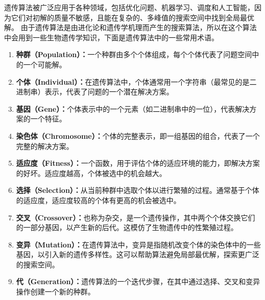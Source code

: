 遗传算法被广泛应用于各种领域，包括优化问题、机器学习、调度和人工智能，因为它们对初解的质量不敏感，且能在复杂的、多峰值的搜索空间中找到全局最优解。
由于遗传算法是由进化论和遗传学机理而产生的搜索算法，所以在这个算法中会用到一些生物遗传学知识，下面是遗传算法中的一些常用术语。
\begin{enumerate}
  \item \textbf{种群（Population）：}一个种群由多个个体组成，每个个体代表了问题空间中的一个可能解。

  \item \textbf{个体（Individual）：}在遗传算法中，个体通常用一个字符串（最常见的是二进制串）表示，代表了问题的一个潜在解决方案。
  
  \item \textbf{基因（Gene）：}个体表示中的一个元素（如二进制串中的一位），代表解决方案的一个特征。
  
  \item \textbf{染色体（Chromosome）：}个体的完整表示，即一组基因的组合，代表了一个完整的解决方案。
  
  \item \textbf{适应度（Fitness）：}一个函数，用于评估个体的适应环境的能力，即解决方案的好坏。适应度越高，个体被选中的机会越大。
  
  \item \textbf{选择（Selection）：}从当前种群中选取个体以进行繁殖的过程。通常基于个体的适应度，适应度较高的个体有更高的机会被选中。
  
  \item \textbf{交叉（Crossover）：}也称为杂交，是一个遗传操作，其中两个个体交换它们的一部分基因，以产生新的后代。这模仿了生物遗传中的性繁殖过程。
  
  \item \textbf{变异（Mutation）：}在遗传算法中，变异是指随机改变个体的染色体中的一些基因，以引入新的遗传多样性。这可以帮助算法避免局部最优解，探索更广泛的搜索空间。
  
  \item \textbf{代（Generation）：}遗传算法的一个迭代步骤，在其中通过选择、交叉和变异操作创建一个新的种群。
  \end{enumerate}

